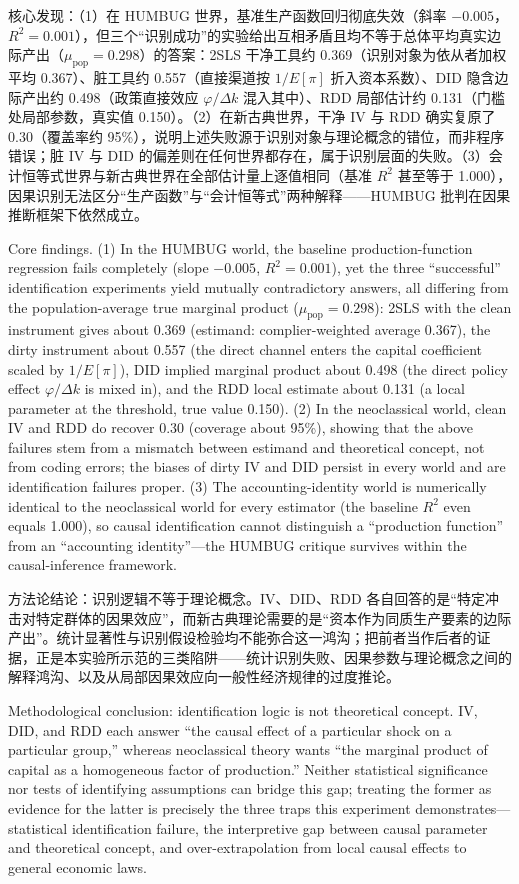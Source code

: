 \documentclass[12pt,a4paper]{ctexart}
\begin{document}
核心发现：（1）在 HUMBUG 世界，基准生产函数回归彻底失效（斜率 $-0.005$，$R^2 = 0.001$），但三个“识别成功”的实验给出互相矛盾且均不等于总体平均真实边际产出（$\mu_{\mathrm{pop}} = 0.298$）的答案：2SLS 干净工具约 0.369（识别对象为依从者加权平均 0.367）、脏工具约 0.557（直接渠道按 $1/E[\pi]$ 折入资本系数）、DID 隐含边际产出约 0.498（政策直接效应 $\varphi/\Delta k$ 混入其中）、RDD 局部估计约 0.131（门槛处局部参数，真实值 0.150）。（2）在新古典世界，干净 IV 与 RDD 确实复原了 0.30（覆盖率约 95\%），说明上述失败源于识别对象与理论概念的错位，而非程序错误；脏 IV 与 DID 的偏差则在任何世界都存在，属于识别层面的失败。（3）会计恒等式世界与新古典世界在全部估计量上逐值相同（基准 $R^2$ 甚至等于 1.000），因果识别无法区分“生产函数”与“会计恒等式”两种解释——HUMBUG 批判在因果推断框架下依然成立。

Core findings. (1) In the HUMBUG world, the baseline production-function regression fails completely (slope $-0.005$, $R^2=0.001$), yet the three “successful” identification experiments yield mutually contradictory answers, all differing from the population-average true marginal product ($\mu_{\mathrm{pop}}=0.298$): 2SLS with the clean instrument gives about 0.369 (estimand: complier-weighted average 0.367), the dirty instrument about 0.557 (the direct channel enters the capital coefficient scaled by $1/E[\pi]$), DID implied marginal product about 0.498 (the direct policy effect $\varphi/\Delta k$ is mixed in), and the RDD local estimate about 0.131 (a local parameter at the threshold, true value 0.150). (2) In the neoclassical world, clean IV and RDD do recover 0.30 (coverage about 95\%), showing that the above failures stem from a mismatch between estimand and theoretical concept, not from coding errors; the biases of dirty IV and DID persist in every world and are identification failures proper. (3) The accounting-identity world is numerically identical to the neoclassical world for every estimator (the baseline $R^2$ even equals 1.000), so causal identification cannot distinguish a “production function” from an “accounting identity”—the HUMBUG critique survives within the causal-inference framework.

方法论结论：识别逻辑不等于理论概念。IV、DID、RDD 各自回答的是“特定冲击对特定群体的因果效应”，而新古典理论需要的是“资本作为同质生产要素的边际产出”。统计显著性与识别假设检验均不能弥合这一鸿沟；把前者当作后者的证据，正是本实验所示范的三类陷阱——统计识别失败、因果参数与理论概念之间的解释鸿沟、以及从局部因果效应向一般性经济规律的过度推论。

Methodological conclusion: identification logic is not theoretical concept. IV, DID, and RDD each answer “the causal effect of a particular shock on a particular group,” whereas neoclassical theory wants “the marginal product of capital as a homogeneous factor of production.” Neither statistical significance nor tests of identifying assumptions can bridge this gap; treating the former as evidence for the latter is precisely the three traps this experiment demonstrates—statistical identification failure, the interpretive gap between causal parameter and theoretical concept, and over-extrapolation from local causal effects to general economic laws.
\end{document}
